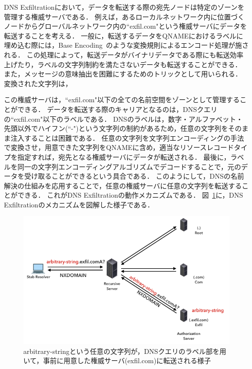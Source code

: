 DNS Exfiltrationにおいて，データを転送する際の宛先ノードは特定のゾーンを管理する権威サーバである．
例えば，あるローカルネットワーク内に位置づくノードからグローバルネットワーク内の``exfil.com"という権威サーバにデータを転送することを考える．
一般に，転送するデータをQNAMEにおけるラベルに埋め込む際には，Base Encoding~\cite{rfc4648}のような変換規則によるエンコード処理が施される．
この処理によって，転送データがバイナリデータである際にも転送効率上げたり，ラベルの文字列制約を満たさないデータも転送することができる．
また，メッセージの意味抽出を困難にするためのトリックとして用いられる．
変換された文字列は，



この権威サーバは，``exfil.com"以下の全ての名前空間をゾーンとして管理することができる．
データを転送する際のキャリアとなるのは，DNSクエリの``exfil.com"以下のラベルである．
DNSのラベルは，数字・アルファベット・先頭以外でハイフン(``-")という文字列の制約があるため，任意の文字列をそのまま注入することは困難である．
任意の文字列を文字列エンコーディングの手法で変換させ，用意できた文字列をQNAMEに含め，適当なリソースレコードタイプを指定すれば，宛先となる権威サーバにデータが転送される．
最後に，ラベルを同一の文字列エンコーディングアルゴリズムでデコードすることで，元のデータを受け取ることができるという具合である．
このようにして，DNSの名前解決の仕組みを応用することで，任意の権威サーバに任意の文字列を転送することができる．
これがDNS Exfiltrationの動作メカニズムである．
図~\ref{fig:dns-exfiltration}に，DNS Exfiltrationのメカニズムを図解した様子である．

\begin{figure}[h]
 \centering
 \includegraphics[width=12.0cm]{figure/dns-exfiltration.png}
 \caption{arbitrary-stringという任意の文字列が，DNSクエリのラベル部を用いて，事前に用意した権威サーバ(exfil.com)に転送される様子}
 \label{fig:dns-exfiltration}
\end{figure}

